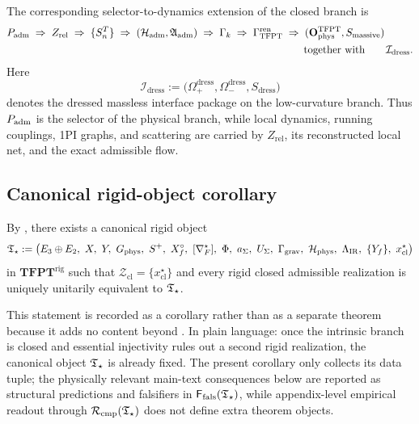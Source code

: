 The corresponding selector-to-dynamics extension of the closed branch is
\[
P_{\mathrm{adm}}
\;\Rightarrow\;
Z_{\mathrm{rel}}
\;\Rightarrow\;
\{S_n^T\}
\;\Rightarrow\;
(\mathcal H_{\mathrm{adm}},\mathfrak A_{\mathrm{adm}})
\;\Rightarrow\;
\Gamma_k
\;\Rightarrow\;
\begin{aligned}[t]
\Gamma_{\mathrm{TFPT}}^{\mathrm{ren}}
&\;\Rightarrow\;
(\mathbf O_{\mathrm{phys}}^{\mathrm{TFPT}},S_{\mathrm{massive}})\\
&\qquad\text{together with}\qquad
\mathcal I_{\mathrm{dress}}.
\end{aligned}
\]
Here
\[
\mathcal I_{\mathrm{dress}}
:=
\bigl(\Omega_+^{\mathrm{dress}},\Omega_-^{\mathrm{dress}},S_{\mathrm{dress}}\bigr)
\]
denotes the dressed massless interface package on the low-curvature branch.
Thus $P_{\mathrm{adm}}$ is the selector of the physical branch, while local dynamics, running couplings, 1PI
graphs, and scattering are carried by $Z_{\mathrm{rel}}$, its reconstructed local net, and the
exact admissible flow.

\subsection{Canonical rigid-object corollary}

\begin{corollary}
\label{cor:canonical-rigid-object}
By ,
there exists a canonical rigid object
\[
\Tstar
:=
\bigl(
E_3\oplus E_2,\ X,\ Y,\ G_{\mathrm{phys}},\ S^+,\ X_f^\circ,\ [\nabla_F^\star],\ \Phi,\ a_\Sigma,\ U_\Sigma,\ \Gamma_{\mathrm{grav}},\ \mathcal H_{\mathrm{phys}},\ \Lambda_{\mathrm{IR}},\ \{Y_f\},\ x_{\mathrm{cl}}^\star
\bigr)
\]
in $\mathbf{TFPT}^{\mathrm{rig}}$ such that $\mathcal Z_{\mathrm{cl}}=\{x_{\mathrm{cl}}^\star\}$
and every rigid closed admissible realization is uniquely unitarily equivalent to $\mathfrak T_{\star}$.
\end{corollary}

\begin{remark}
This statement is recorded as a corollary rather than as a separate theorem because it adds no
content beyond .
In plain language: once the intrinsic branch is closed and essential injectivity rules out a
second rigid realization, the canonical object $\mathfrak T_{\star}$ is already fixed. The present corollary
only collects its data tuple; the physically relevant main-text consequences below are reported as
structural predictions and falsifiers in $\mathsf F_{\mathrm{fals}}(\mathfrak T_{\star})$, while appendix-level empirical readout
through $\mathcal R_{\mathrm{cmp}}(\mathfrak T_{\star})$ does not define extra theorem objects.
\end{remark}

